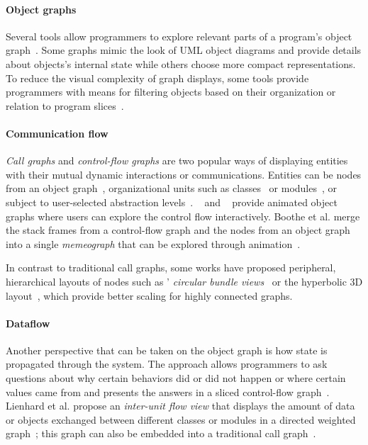 \paragraph{Object graphs}

Several tools allow programmers to explore relevant parts of a program's object graph~\cite{moreno2004visualizing,gestwicki2005methodology}.
Some graphs mimic the look of UML object diagrams and provide details about objects's internal state while others choose more compact representations.
To reduce the visual complexity of graph displays, some tools provide programmers with means for filtering objects based on their organization or relation to program slices~\cite{lange1997object,hamouLhadj2004survey}.

\paragraph{Communication flow}

\emph{Call graphs} and \emph{control-flow graphs} are two popular ways of displaying entities with their mutual dynamic interactions or communications.
Entities can be nodes from an object graph~\cite{tramnitzke2007object}, organizational units such as classes~\cite{reiss2007visual} or modules~\cite{prestin2022hidden}, or subject to user-selected abstraction levels~\cite{lange1997object,dePauw1998execution,walker1998visualizing}.
~\cite{walker1998visualizing} and ~\cite{schweizer2014pathobjects} provide animated object graphs where users can explore the control flow interactively.
Boothe et al. merge the stack frames from a control-flow graph and the nodes from an object graph into a single \emph{memeograph} that can be explored through animation~\cite{boothe2011animation}.

In contrast to traditional call graphs, some works have proposed peripheral, hierarchical layouts of nodes such as ' \emph{circular bundle views}~\cite{cornelissen2009trace} or the  hyperbolic 3D layout~\cite{munzner1997h3}, which provide better scaling for highly connected graphs.

\paragraph{Dataflow}

Another perspective that can be taken on the object graph is how state is propagated through the system.
The  approach allows programmers to ask questions about why certain behaviors did or did not happen or where certain values came from and presents the answers in a sliced control-flow graph~\cite{ko2008debugging}.
Lienhard et al. propose an \emph{inter-unit flow view} that displays the amount of data or objects exchanged between different classes or modules in a directed weighted graph~\cite{lienhard2009taking}; this graph can also be embedded into a traditional call graph~\cite{lienhard2009flow}.

